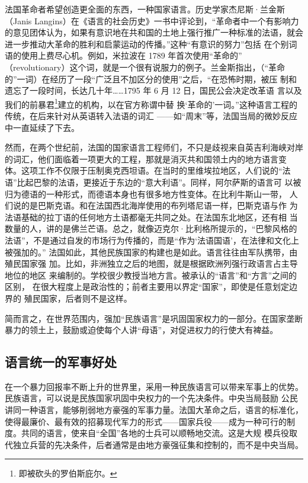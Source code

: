 法国革命者希望创造更全面的东西，一种国家语言。历史学家杰尼斯·兰金斯 （Janis Langins）在《语言的社会历史》一书中评论到，“革命者中一个有影响力的意见团体认为，如果有意识地在共和国的土地上强行推广一种标准的法语，就会进一步推动大革命的胜利和启蒙运动的传播。”这种“有意识的努力”包括 在个别词语的使用上费尽心机。例如，米拉波在 1789 年首次使用“革命的” （revolutionary）这个词，就是一个很有说服力的例子。兰金斯指出，（“革命 的”一词）在经历了一段“广泛且不加区分的使用”之后，“在恐怖时期，被压 制和遗忘了一段时间，长达几十年……1795 年 6 月 12 日，国民公会决定改革语 言以及我们的前暴君\footnote{即被砍头的罗伯斯庇尔。}建立的机构，以在官方称谓中替 换‘革命的’一词。”这种语言工程的传统，在后来针对从英语转入法语的词汇 ——如“周末”等，法国当局的微妙反应中一直延续了下去。

然而，在两个世纪前，法国的国家语言工程师们，不只是歧视来自英吉利海峡对岸的词汇，他们面临着一项更大的工程，那就是消灭共和国领土内的地方语言变 体。这项工作不仅限于压制奥克西坦语。在当时的里维埃拉地区，人们说的“法语”比起巴黎的法语，更接近于东边的“意大利语”。同样，阿尔萨斯的语言可 以被归为德语的一种形式，而德语本身也有很多地方性变体。在比利牛斯山一带， 人们说的是巴斯克语。和在法国西北海岸使用的布列塔尼语一样，巴斯克语与作 为法语基础的拉丁语的任何地方土语都毫无共同之处。在法国东北地区，还有相  当数量的人，讲的是佛兰芒语。总之，就像迈克尔·比利格所提示的，“巴黎风格的法语”，不是通过自发的市场行为传播的，而是“作为‘法语国语’，在法律和文化上被强加的。” 法国如此，其他民族国家的构建也是如此。语言往往由军队携带，由殖民国家强 加。比如，非洲独立之后的地图，就是根据欧洲列强行政语言占主导地位的地区 来编制的。学校很少教授当地方言。被承认的“语言”和“方言”之间的区别， 在很大程度上是政治性的；前者主要用以界定“国家”，即使是任意划定边界的 殖民国家，后者则不是这样。

简而言之，在世界范围内，强加“民族语言”是巩固国家权力的一部分。在国家垄断暴力的领土上，鼓励或迫使每个人讲“母语”，对促进权力的行使大有裨益。

\subsection{语言统一的军事好处}

在一个暴力回报率不断上升的世界里，采用一种民族语言可以带来军事上的优势。民族语言，可以说是民族国家巩固中央权力的一个先决条件。中央当局鼓励 公民讲同一种语言，能够削弱地方豪强的军事力量。法国大革命之后，语言的标准化，使得最廉价、最有效的招募现代军力的形式——国家兵役——成为一种可行的制度。共同的语言，使来自“全国”各地的士兵可以顺畅地交流。这是大规 模兵役取代独立兵营的先决条件，后者通常是由地方豪强征集和控制的，而不是中央当局。


